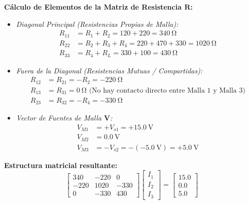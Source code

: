 \documentclass[11pt, a4paper]{article}
\begin{document}
\textbf{Cálculo de Elementos de la Matriz de Resistencia $\mathbf{R}$:}
\begin{itemize}
    \item \textit{Diagonal Principal (Resistencias Propias de Malla):}
    \begin{align*}
        R_{11} &= R_1 + R_2 = 120 + 220 = \qty{340}{\ohm} \\
        R_{22} &= R_2 + R_3 + R_4 = 220 + 470 + 330 = \qty{1020}{\ohm} \\
        R_{33} &= R_4 + R_L = 330 + 100 = \qty{430}{\ohm}
    \end{align*}
    \item \textit{Fuera de la Diagonal (Resistencias Mutuas / Compartidas):}
    \begin{align*}
        R_{12} &= R_{21} = -R_2 = \qty{-220}{\ohm} \\
        R_{13} &= R_{31} = \qty{0}{\ohm} \text{ (No hay contacto directo entre Malla 1 y Malla 3)} \\
        R_{23} &= R_{32} = -R_4 = \qty{-330}{\ohm}
    \end{align*}
    \item \textit{Vector de Fuentes de Malla $\mathbf{V}$:}
    \begin{align*}
        V_{M1} &= +V_{s1} = +\qty{15.0}{\volt} \\
        V_{M2} &= \qty{0.0}{\volt} \\
        V_{M3} &= -V_{s2} = -(\qty{-5.0}{\volt}) = +\qty{5.0}{\volt}
    \end{align*}
\end{itemize}

\textbf{Estructura matricial resultante:}
\begin{equation}
    \begin{bmatrix} 340 & -220 & 0 \\ -220 & 1020 & -330 \\ 0 & -330 & 430 \end{bmatrix} \begin{bmatrix} I_1 \\ I_2 \\ I_3 \end{bmatrix} = \begin{bmatrix} 15.0 \\ 0.0 \\ 5.0 \end{bmatrix}
\end{equation}
\end{document}
